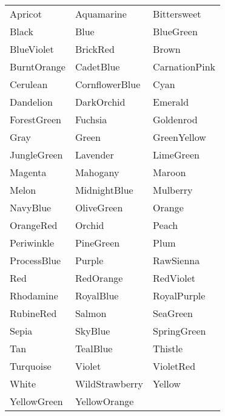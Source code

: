 \documentclass{article}
\newcommand\colorcard[1]{\fcolorbox{black}{#1}{\phantom{MM}} \quad #1}
\begin{document}
        \begin{table}[t]
          \begin{tabular}{lll}
            \colorcard{Apricot} & \colorcard{Aquamarine} & \colorcard{Bittersweet} \\
            \colorcard{Black} & \colorcard{Blue} & \colorcard{BlueGreen} \\
            \colorcard{BlueViolet} & \colorcard{BrickRed} & \colorcard{Brown} \\
            \colorcard{BurntOrange} & \colorcard{CadetBlue} & \colorcard{CarnationPink} \\
            \colorcard{Cerulean} & \colorcard{CornflowerBlue} & \colorcard{Cyan} \\
            \colorcard{Dandelion} & \colorcard{DarkOrchid} & \colorcard{Emerald} \\
            \colorcard{ForestGreen} & \colorcard{Fuchsia} & \colorcard{Goldenrod} \\
            \colorcard{Gray} & \colorcard{Green} & \colorcard{GreenYellow} \\
            \colorcard{JungleGreen} & \colorcard{Lavender} & \colorcard{LimeGreen} \\
            \colorcard{Magenta} & \colorcard{Mahogany} & \colorcard{Maroon} \\
            \colorcard{Melon} & \colorcard{MidnightBlue} & \colorcard{Mulberry} \\
            \colorcard{NavyBlue} & \colorcard{OliveGreen} & \colorcard{Orange} \\
            \colorcard{OrangeRed} & \colorcard{Orchid} & \colorcard{Peach} \\
            \colorcard{Periwinkle} & \colorcard{PineGreen} & \colorcard{Plum} \\
            \colorcard{ProcessBlue} & \colorcard{Purple} & \colorcard{RawSienna} \\
            \colorcard{Red} & \colorcard{RedOrange} & \colorcard{RedViolet} \\
            \colorcard{Rhodamine} & \colorcard{RoyalBlue} & \colorcard{RoyalPurple} \\
            \colorcard{RubineRed} & \colorcard{Salmon} & \colorcard{SeaGreen} \\
            \colorcard{Sepia} & \colorcard{SkyBlue} & \colorcard{SpringGreen} \\
            \colorcard{Tan} & \colorcard{TealBlue} & \colorcard{Thistle} \\
            \colorcard{Turquoise} & \colorcard{Violet} & \colorcard{VioletRed} \\
            \colorcard{White} & \colorcard{WildStrawberry} & \colorcard{Yellow} \\
            \colorcard{YellowGreen} & \colorcard{YellowOrange} & \\
          \end{tabular}
        \end{table}
        
\end{document}
